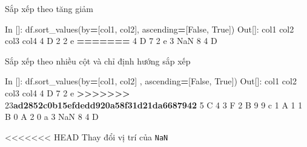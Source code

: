 \documentclass[
]{book}
\newenvironment{Shaded}{\begin{snugshade}}{\end{snugshade}}
\newcommand{\DecValTok}[1]{\textcolor[rgb]{0.00,0.00,0.81}{#1}}
\newcommand{\ErrorTok}[1]{\textcolor[rgb]{0.64,0.00,0.00}{\textbf{#1}}}
\newcommand{\NormalTok}[1]{#1}
\newcommand{\OperatorTok}[1]{\textcolor[rgb]{0.81,0.36,0.00}{\textbf{#1}}}
\newcommand{\StringTok}[1]{\textcolor[rgb]{0.31,0.60,0.02}{#1}}
\newcommand{\VariableTok}[1]{\textcolor[rgb]{0.00,0.00,0.00}{#1}}
\begin{document}
Sắp xếp theo tăng giảm

\begin{Shaded}
\begin{Highlighting}[]
\NormalTok{In []: df.sort\_values(by}\OperatorTok{=}\NormalTok{[}\StringTok{\textquotesingle{}col1\textquotesingle{}}\NormalTok{, }\StringTok{\textquotesingle{}col2\textquotesingle{}}\NormalTok{], ascending}\OperatorTok{=}\NormalTok{[}\VariableTok{False}\NormalTok{, }\VariableTok{True}\NormalTok{])}
\NormalTok{Out[]:}
\NormalTok{  col1  col2  col3 col4}
\DecValTok{4}\NormalTok{    D     }\DecValTok{2}     \DecValTok{2}\NormalTok{    e}
\OperatorTok{=======}
\DecValTok{4}\NormalTok{    D     }\DecValTok{7}     \DecValTok{2}\NormalTok{    e}
\DecValTok{3}\NormalTok{  NaN     }\DecValTok{8}     \DecValTok{4}\NormalTok{    D}
\end{Highlighting}
\end{Shaded}

Sắp xếp theo nhiều cột và chỉ định hướng sắp xếp

\begin{Shaded}
\begin{Highlighting}[]
\NormalTok{In []: df.sort\_values(by}\OperatorTok{=}\NormalTok{[}\StringTok{\textquotesingle{}col1\textquotesingle{}}\NormalTok{, }\StringTok{\textquotesingle{}col2\textquotesingle{}}\NormalTok{] , ascending}\OperatorTok{=}\NormalTok{[}\VariableTok{False}\NormalTok{, }\VariableTok{True}\NormalTok{])}
\NormalTok{Out[]:}
\NormalTok{  col1  col2  col3 col4}
\DecValTok{4}\NormalTok{    D     }\DecValTok{7}     \DecValTok{2}\NormalTok{    e}
\OperatorTok{\textgreater{}\textgreater{}\textgreater{}\textgreater{}\textgreater{}\textgreater{}\textgreater{}} \DecValTok{23}\ErrorTok{ad2852c0b15efdedd920a58f31d21da6687942}
\DecValTok{5}\NormalTok{    C     }\DecValTok{4}     \DecValTok{3}\NormalTok{    F}
\DecValTok{2}\NormalTok{    B     }\DecValTok{9}     \DecValTok{9}\NormalTok{    c}
\DecValTok{1}\NormalTok{    A     }\DecValTok{1}     \DecValTok{1}\NormalTok{    B}
\DecValTok{0}\NormalTok{    A     }\DecValTok{2}     \DecValTok{0}\NormalTok{    a}
\DecValTok{3}\NormalTok{  NaN     }\DecValTok{8}     \DecValTok{4}\NormalTok{    D}
\end{Highlighting}
\end{Shaded}

\textless\textless\textless\textless\textless\textless\textless{} HEAD
Thay đổi vị trí của \texttt{NaN}
\end{document}
